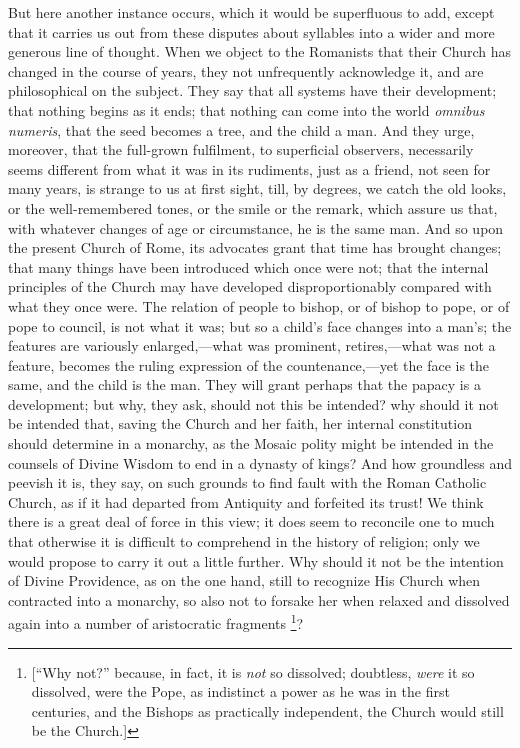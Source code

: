 But here another instance occurs, which it would
be superfluous to add, except that it carries us out from these
disputes about syllables into a wider and more generous line of
thought. When we object to the Romanists that their Church has changed
in the course of years, they not unfrequently acknowledge it, and are
philosophical on the subject. They say that all systems have their
development; that nothing begins as it ends; that nothing can come
into the world \emph{omnibus numeris}, that the seed becomes a tree,
and the child a man. And they urge, moreover, that the full-grown
fulfilment, to superficial observers, necessarily seems different from
what it was in its rudiments, just as a friend, not seen for many
years, is strange to us at first sight, till, by degrees, we catch the
old looks, or the well-remembered tones, or the smile or the remark,
which assure us that, with whatever changes of age or circumstance, he
is the same man. And so upon the present Church of Rome, its advocates
grant that time has brought changes; that many things have been
introduced which once were not; that the internal principles of the
Church may have developed disproportionably compared with what they
once were. The relation of people to bishop, or of bishop to
pope, or of pope to council, is not what it was; but so a child's
face changes into a man's; the features are variously
enlarged,—what was prominent, retires,—what was not a feature,
becomes the ruling expression of the countenance,—yet the face is
the same, and the child is the man. They will grant perhaps that the
papacy is a development; but why, they ask, should not this be
intended? why should it not be intended that, saving the Church and
her faith, her internal constitution should determine in a monarchy,
as the Mosaic polity might be intended in the counsels of Divine
Wisdom to end in a dynasty of kings? And how groundless and peevish it
is, they say, on such grounds to find fault with the Roman Catholic
Church, as if it had departed from Antiquity and forfeited its trust!
We think there is a great deal of force in this view; it does seem to
reconcile one to much that otherwise it is difficult to comprehend in
the history of religion; only we would propose to carry it out a
little further. Why should it not be the intention of Divine
Providence, as on the one hand, still to recognize His Church when
contracted into a monarchy, so also not to forsake her when relaxed
and dissolved again into a number of aristocratic fragments \footnote{[``Why not?'' because, in fact, it is \emph{not}
so dissolved; doubtless, \emph{were} it so dissolved, were the Pope,
as indistinct a power as he was in the first centuries, and the
Bishops as practically independent, the Church would still be the
Church.]}?
